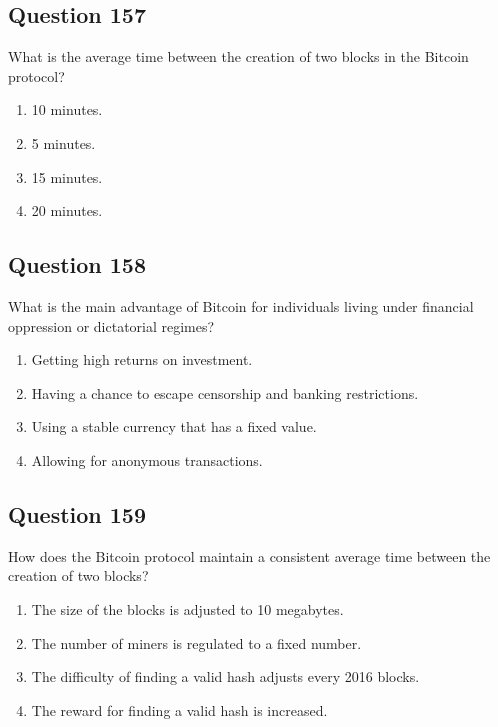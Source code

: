 \documentclass[12pt,a4paper]{article}
\begin{document}
\bigskip


\subsection*{Question 157}
What is the average time between the creation of two blocks in the Bitcoin protocol?

\begin{enumerate}[label=\Alph*., leftmargin=*]
\item 10 minutes.
\item 5 minutes.
\item 15 minutes.
\item 20 minutes.
\end{enumerate}

\bigskip


\subsection*{Question 158}
What is the main advantage of Bitcoin for individuals living under financial oppression or dictatorial regimes?

\begin{enumerate}[label=\Alph*., leftmargin=*]
\item Getting high returns on investment.
\item Having a chance to escape censorship and banking restrictions.
\item Using a stable currency that has a fixed value.
\item Allowing for anonymous transactions.
\end{enumerate}

\bigskip


\subsection*{Question 159}
How does the Bitcoin protocol maintain a consistent average time between the creation of two blocks?

\begin{enumerate}[label=\Alph*., leftmargin=*]
\item The size of the blocks is adjusted to 10 megabytes.
\item The number of miners is regulated to a fixed number.
\item The difficulty of finding a valid hash adjusts every 2016 blocks.
\item The reward for finding a valid hash is increased.
\end{enumerate}
\end{document}
